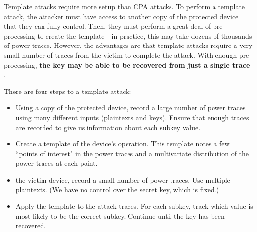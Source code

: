     Template attacks require more setup than CPA attacks. To perform a template attack, the attacker must have access to another copy of the protected device that they can fully control. Then, they must perform a great deal of pre-processing to create the template - in practice, this may take dozens of thousands of power traces. However, the advantages are that template attacks require a very small number of traces from the victim to complete the attack. With enough pre-processing, \textbf{the key may be able to be recovered from just a single trace} .
    
    
    There are four steps to a template attack:
    \begin{itemize}
      \item Using a copy of the protected device, record a large number of power traces using many different inputs (plaintexts and keys). Ensure that enough traces are recorded to give us information about each subkey value.
      \item Create a template of the device's operation. This template notes a few ``points of interest" in the power traces and a multivariate distribution of the power traces at each point.
      \item the victim device, record a small number of power traces. Use multiple plaintexts. (We have no control over the secret key, which is fixed.)
      \item Apply the template to the attack traces. For each subkey, track which value is most likely to be the correct subkey. Continue until the key has been recovered.
    \end{itemize}
    
